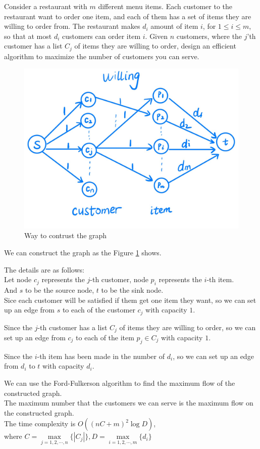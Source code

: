 \problem{}
Consider a restaurant with $m$ different menu items. Each customer to the restaurant want to order one item, and each of them has a set of items they are willing to order from. The restaurant makes $d_i$ amount of item $i$, for $1 \leq i \leq m$, so that at most $d_i$ customers can order item $i$. Given $n$ customers, where the $j$'th customer has a list $C_j$ of items they are willing to order, design an efficient algorithm to maximize the number of customers you can serve.

\solution{}
\begin{figure}[htbp]
    \centering
    \includegraphics[width=\linewidth]{../fig/p3.png}
    \caption{Way to contrust the graph}
    \label{fig:p3}
\end{figure}
We can construct the graph as the Figure \ref{fig:p3} shows.

The details are as follows:\\
Let node $c_j$ represents the $j$-th customer, node $p_i$ represents the $i$-th item.\\
And $s$ to be the source node, $t$ to be the sink node.\\

Sice each customer will be satisfied if them get one item they want, so we can set up an edge from $s$ to each of the customer $c_j$ with capacity $1$.

Since the $j$-th customer has a list $C_j$ of items they are willing to order, so we can set up an edge from $c_j$ to each of the item $p_j\in C_j$ with capacity $1$.

Since the $i$-th item has been made in the number of $d_i$, so we can set up an edge from $d_i$ to $t$ with capacity $d_i$.

We can use the Ford-Fulkerson algorithm to find the maximum flow of the constructed graph.\\

The maximum number that the customers we can serve is the maximum flow on the constructed graph.\\
The time complexity is $O((nC+m)^2\log D)$,\\
where $C=\max\limits_{j=1,2,\cdots,n}\{|C_j|\},D=\max\limits_{i=1,2,\cdots,m}\{d_i\}$\\

\newpage